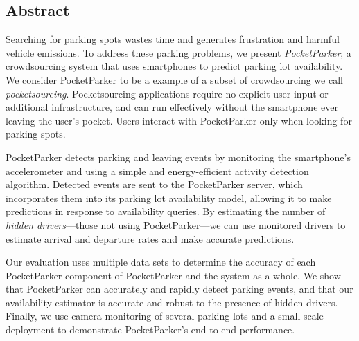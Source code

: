 \subsection*{Abstract}

Searching for parking spots wastes time and generates frustration and harmful
vehicle emissions. To address these parking problems, we present
\textit{PocketParker}, a crowdsourcing system that uses smartphones to
predict parking lot availability. We consider PocketParker to be a example of
a subset of crowdsourcing we call \textit{pocketsourcing}. Pocketsourcing
applications require no explicit user input or additional infrastructure, and
can run effectively without the smartphone ever leaving the user's pocket.
Users interact with PocketParker only when looking for parking spots.

PocketParker detects parking and leaving events by monitoring the
smartphone's accelerometer and using a simple and energy-efficient activity
detection algorithm. Detected events are sent to the PocketParker server,
which incorporates them into its parking lot availability model, allowing it
to make predictions in response to availability queries. By estimating the
number of \textit{hidden drivers}---those not using PocketParker---we can use
monitored drivers to estimate arrival and departure rates and make accurate
predictions.

Our evaluation uses multiple data sets to determine the accuracy of each
PocketParker component of PocketParker and the system as a whole. We show
that PocketParker can accurately and rapidly detect parking events, and that
our availability estimator is accurate and robust to the presence of hidden
drivers. Finally, we use camera monitoring of several parking lots and a
small-scale deployment to demonstrate PocketParker's end-to-end performance. 

